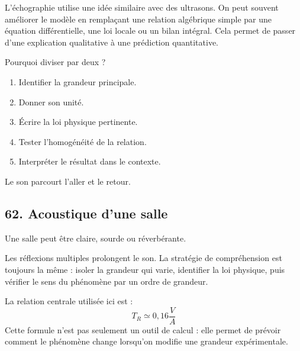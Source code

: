 \documentclass[11pt,a4paper]{article}
\begin{document}
\begin{approfondissementbox}
L'échographie utilise une idée similaire avec des ultrasons.
On peut souvent améliorer le modèle en remplaçant une relation algébrique simple par une équation différentielle, une loi locale ou un bilan intégral. Cela permet de passer d'une explication qualitative à une prédiction quantitative.
\end{approfondissementbox}

\begin{exercicebox}
Pourquoi diviser par deux ?
\begin{enumerate}
  \item Identifier la grandeur principale.
  \item Donner son unité.
  \item Écrire la loi physique pertinente.
  \item Tester l'homogénéité de la relation.
  \item Interpréter le résultat dans le contexte.
\end{enumerate}
\end{exercicebox}

\begin{corrigebox}[Indication]
Le son parcourt l'aller et le retour.
\end{corrigebox}


\subsection{62. Acoustique d'une salle}

\begin{exemplebox}
Une salle peut être claire, sourde ou réverbérante.
\end{exemplebox}

\begin{methodebox}
Les réflexions multiples prolongent le son.
La stratégie de compréhension est toujours la même : isoler la grandeur qui varie, identifier la loi physique, puis vérifier le sens du phénomène par un ordre de grandeur.
\end{methodebox}

\begin{theorembox}
La relation centrale utilisée ici est :
\[
T_R\simeq0{,}16\frac{V}{A}
\]
Cette formule n'est pas seulement un outil de calcul : elle permet de prévoir comment le phénomène change lorsqu'on modifie une grandeur expérimentale.
\end{theorembox}
\end{document}
